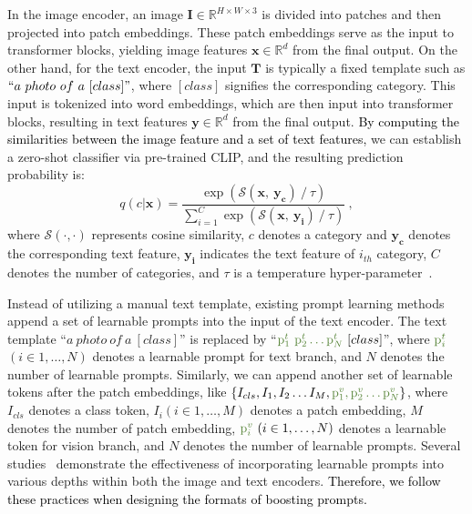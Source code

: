 \documentclass[runningheads]{llncs}
\newcommand{\implus}[1]{\textcolor{black}{#1}}
\newcommand{\important}[1]{\textcolor{black}{#1}}
\begin{document}
{In the image encoder, an image $\boldsymbol{I}\in\mathbb{R}^{H\times W\times 3}$ is divided into patches and then projected into patch embeddings. These patch embeddings serve as the input to transformer blocks, yielding image features $\boldsymbol{x}\in\mathbb{R}^d$ from the final output. On the other hand, for the text encoder, the input $\boldsymbol{T}$ is typically a fixed template such as ${``a\ photo\ of\ a\ [class]"}$, where ${[class]}$ signifies the corresponding category. This input is tokenized into word embeddings, which are then input into transformer blocks, resulting in text features $\boldsymbol{y}\in\mathbb{R}^d$ from the final output. \implus{By computing the similarities between the image feature and a set of text features,} we can establish a zero-shot classifier via pre-trained CLIP, and the resulting prediction probability is:
\begin{equation}
q(c|\boldsymbol{x})=\frac{\exp{(\mathcal{S}({\boldsymbol{x}},\ {\boldsymbol{y_c}}) \ / \ \tau)}}{\sum_{i=1}^C\exp{(\mathcal{S}({\boldsymbol{x}},\ {\boldsymbol{y_i}}) \ / \ \tau)}}\ ,
\end{equation}
where $\mathcal{S}(\cdot,\cdot)$ represents cosine similarity, $c$ denotes a category and $\boldsymbol{y_c}$ denotes the corresponding text feature, $\boldsymbol{y_i}$ indicates the text feature of $i_{th}$ category, $C$ denotes the number of categories, and $\tau$ is a temperature hyper-parameter~\cite{hinton2015distilling}.

Instead of utilizing a manual text template, existing prompt learning methods~\cite{li2021prefix, zhou2022learning} append a set of learnable prompts into the input of the text encoder. The text template ``${a\ photo\ of\ a\ [class]}$'' is replaced by ``${\color{adapt_line}{{\mathrm{p}_1^t \ \mathrm{p}_2^t\dots \mathrm{p}_N^t}}} \ [class]$'', where ${\color{adapt_line}{\mathrm{p}^t_i}}$ $(i \in 1,\dots,N)$ denotes a learnable prompt for text branch, and $N$ denotes the number of learnable prompts. Similarly, we can append another set of learnable tokens after the patch embeddings, like $\{I_{cls}, I_1, I_2\dots I_M, {\color{adapt_line}{\mathrm{p}^v_1,\mathrm{p}_2^v\dots \mathrm{p}_N^v}} \}$, where $I_{cls}$ denotes a class token, $I_i(i\in1,\dots, M)$ denotes a patch embedding, $M$ denotes the number of patch embedding, ${\color{adapt_line}{\mathrm{p}^v_i}}\ (i\in1,\dots, N)$ denotes a learnable token for vision branch, and $N$ denotes the number of learnable prompts. Several studies~\cite{khattak2023maple,jia2022visual,khattak2023self} demonstrate the effectiveness of incorporating learnable prompts into various depths within both the image and text encoders. \important{Therefore, we follow these practices when designing the formats of boosting prompts.}


}
\end{document}
